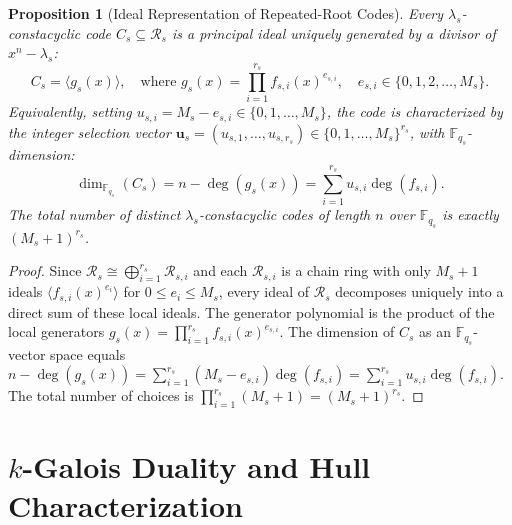 \documentclass[preprint,12pt]{elsarticle}
\numberwithin{equation}{section}
\theoremstyle{plain}
\newtheorem{proposition}[theorem]{Proposition}
\theoremstyle{definition}
\theoremstyle{remark}
\begin{document}
\begin{proposition}[Ideal Representation of Repeated-Root Codes]\label{prop:ideal_rep}
Every $\lambda_s$-constacyclic code $C_s \subseteq \mathcal{R}_s$ is a principal ideal uniquely generated by a divisor of $x^n - \lambda_s$:
\begin{equation}
    C_s = \langle g_s(x)\rangle, \quad \text{where } g_s(x) = \prod_{i=1}^{r_s} f_{s, i}(x)^{e_{s, i}}, \quad e_{s, i} \in \{0, 1, 2, \dots, M_s\}.
\end{equation}
Equivalently, setting $u_{s, i} = M_s - e_{s, i} \in \{0, 1, \dots, M_s\}$, the code is characterized by the integer selection vector $\mathbf{u}_s = (u_{s, 1}, \dots, u_{s, r_s}) \in \{0, 1, \dots, M_s\}^{r_s}$, with $\mathbb{F}_{q_s}$-dimension:
\begin{equation}\label{eq:dim_formula}
    \dim_{\mathbb{F}_{q_s}}(C_s) = n - \deg(g_s(x)) = \sum_{i=1}^{r_s} u_{s, i} \deg(f_{s, i}).
\end{equation}
The total number of distinct $\lambda_s$-constacyclic codes of length $n$ over $\mathbb{F}_{q_s}$ is exactly $(M_s + 1)^{r_s}$.
\end{proposition}
\begin{proof}
Since $\mathcal{R}_s \cong \bigoplus_{i=1}^{r_s} \mathcal{R}_{s, i}$ and each $\mathcal{R}_{s, i}$ is a chain ring with only $M_s + 1$ ideals $\langle f_{s, i}(x)^{e_i}\rangle$ for $0 \le e_i \le M_s$, every ideal of $\mathcal{R}_s$ decomposes uniquely into a direct sum of these local ideals. The generator polynomial is the product of the local generators $g_s(x) = \prod_{i=1}^{r_s} f_{s, i}(x)^{e_{s, i}}$. The dimension of $C_s$ as an $\mathbb{F}_{q_s}$-vector space equals $n - \deg(g_s(x)) = \sum_{i=1}^{r_s} (M_s - e_{s, i}) \deg(f_{s, i}) = \sum_{i=1}^{r_s} u_{s, i} \deg(f_{s, i})$. The total number of choices is $\prod_{i=1}^{r_s} (M_s + 1) = (M_s + 1)^{r_s}$.
\end{proof}

\section{\texorpdfstring{$k$}{k}-Galois Duality and Hull Characterization}\label{sec:duality}
\end{document}
